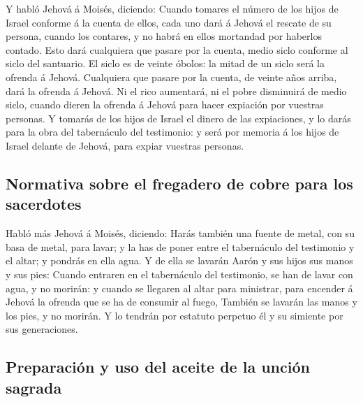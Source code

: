  Y habló Jehová á Moisés, diciendo: 
Cuando tomares el número de los hijos de Israel conforme á la cuenta de
ellos, cada uno dará á Jehová el rescate de su persona, cuando los
contares, y no habrá en ellos mortandad por haberlos contado.
 Esto dará cualquiera que pasare por la cuenta, medio
siclo conforme al siclo del santuario. El siclo es de veinte óbolos: la
mitad de un siclo será la ofrenda á Jehová.  Cualquiera
que pasare por la cuenta, de veinte años arriba, dará la ofrenda á
Jehová.  Ni el rico aumentará, ni el pobre disminuirá de
medio siclo, cuando dieren la ofrenda á Jehová para hacer expiación por
vuestras personas.  Y tomarás de los hijos de Israel el
dinero de las expiaciones, y lo darás para la obra del tabernáculo del
testimonio: y será por memoria á los hijos de Israel delante de Jehová,
para expiar vuestras personas.

\hypertarget{normativa-sobre-el-fregadero-de-cobre-para-los-sacerdotes}{%
\subsection{Normativa sobre el fregadero de cobre para los
sacerdotes}\label{normativa-sobre-el-fregadero-de-cobre-para-los-sacerdotes}}

 Habló más Jehová á Moisés, diciendo: 
Harás también una fuente de metal, con su basa de metal, para lavar; y
la has de poner entre el tabernáculo del testimonio y el altar; y
pondrás en ella agua.  Y de ella se lavarán Aarón y sus
hijos sus manos y sus pies:  Cuando entraren en el
tabernáculo del testimonio, se han de lavar con agua, y no morirán: y
cuando se llegaren al altar para ministrar, para encender á Jehová la
ofrenda que se ha de consumir al fuego,  También se
lavarán las manos y los pies, y no morirán. Y lo tendrán por estatuto
perpetuo él y su simiente por sus generaciones.

\hypertarget{preparaciuxf3n-y-uso-del-aceite-de-la-unciuxf3n-sagrada}{%
\subsection{Preparación y uso del aceite de la unción
sagrada}\label{preparaciuxf3n-y-uso-del-aceite-de-la-unciuxf3n-sagrada}}

